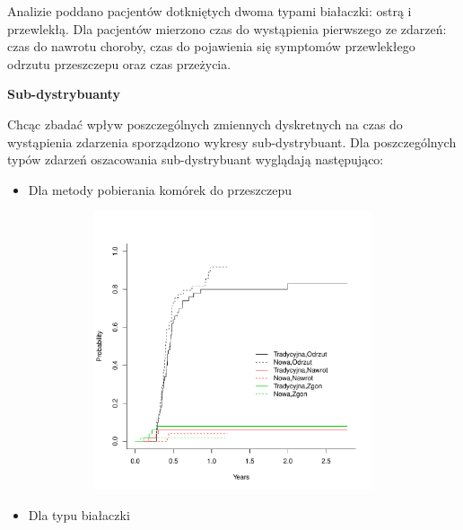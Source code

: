 \documentclass[]{article}
\title{}
\author{}
\date{}
\begin{document}
\maketitle


\thispagestyle{fancy} Analizie poddano pacjentów dotkniętych dwoma
typami białaczki: ostrą i przewlekłą. Dla pacjentów mierzono czas do
wystąpienia pierwszego ze zdarzeń: czas do nawrotu choroby, czas do
pojawienia się symptomów przewlekłego odrzutu przeszczepu oraz czas
przeżycia.

\vspace{10pt}

\textbf{Sub-dystrybuanty}

Chcąc zbadać wpływ poszczególnych zmiennych dyskretnych na czas do
wystąpienia zdarzenia sporządzono wykresy sub-dystrybuant. Dla
poszczególnych typów zdarzeń oszacowania sub-dystrybuant wyglądają
następująco:

\begin{itemize}
\itemsep1pt\parskip0pt
\item
  Dla metody pobierania komórek do przeszczepu
\end{itemize}

\vspace{-22pt}

\includegraphics[width=16cm,height=8.2cm]{plot1.pdf}

\begin{itemize}
\itemsep1pt\parskip0pt
\item
  Dla typu białaczki
\end{itemize}

\vspace{-22pt}
\end{document}
